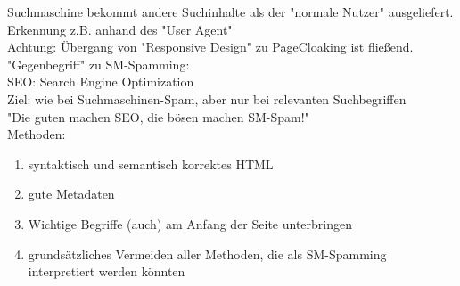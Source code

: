 Suchmaschine bekommt andere Suchinhalte als der "normale Nutzer" ausgeliefert. Erkennung z.B. anhand des "User Agent"\\
Achtung: Übergang von "Responsive Design" zu PageCloaking ist fließend.
"Gegenbegriff" zu SM-Spamming:\\
SEO: Search Engine Optimization\\
Ziel: wie bei Suchmaschinen-Spam, aber nur bei relevanten Suchbegriffen\\
"Die guten machen SEO, die bösen machen SM-Spam!"\\
Methoden:
\begin{enumerate}
\item syntaktisch und semantisch korrektes HTML
\item gute Metadaten
\item Wichtige Begriffe (auch) am Anfang der Seite unterbringen
\item grundsätzliches Vermeiden aller Methoden, die als SM-Spamming interpretiert werden könnten
\end{enumerate}

